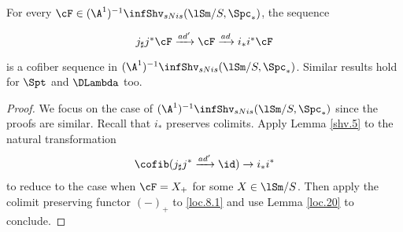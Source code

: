 \documentclass[10pt]{amsart}
\begin{document}
\begin{thm}
\label{loc.17}
For every $\cF\in (\A^1)^{-1}\infShv_{sNis}(\lSm/S,\Spc_*)$, the sequence
\begin{equation}
\label{loc.17.1}
\begin{tikzcd}
j_\sharp j^* \cF
\xrightarrow{ad'}
\cF
\xrightarrow{ad}
i_*i^*\cF
\end{tikzcd}
\end{equation}
is a cofiber sequence in $(\A^1)^{-1}\infShv_{sNis}(\lSm/S,\Spc_*)$.
Similar results hold for $\Spt$ and $\DLambda$ too.
\end{thm}
\begin{proof}
We focus on the case of $(\A^1)^{-1}\infShv_{sNis}(\lSm/S,\Spc_*)$ since the proofs are similar.
Recall that $i_*$ preserves colimits.
Apply Lemma \ref{shv.5} to the natural transformation
\[
\cofib(j_\sharp j^*\xrightarrow{ad'}\id)
\to
i_*i^*
\]
to reduce to the case when $\cF=X_+$ for some $X\in \lSm/S$.
Then apply the colimit preserving functor $(-)_+$ to \eqref{loc.8.1} and use Lemma \ref{loc.20} to conclude.
\end{proof}
\end{document}
